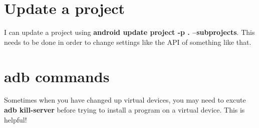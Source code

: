 \documentclass[english]{article}
\begin{document}
\section*{Update a project}
I can update a project using \textbf{android update project -p . --subprojects}. This needs to be done in order to change settings like the API of something like that.

\section*{adb commands}
Sometimes when you have changed up virtual devices, you may need to excute \textbf{adb kill-server} before trying to install a program on a virtual device. This is helpful!
\end{document}
